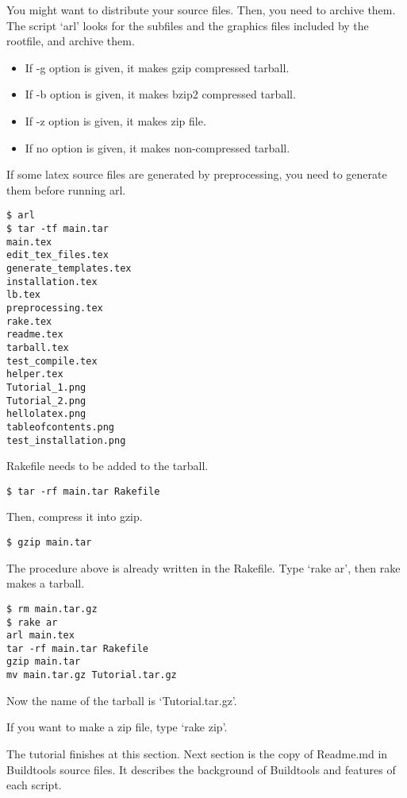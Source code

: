 You might want to distribute your source files.
Then, you need to archive them.
The script `arl' looks for the subfiles and the graphics files included by the rootfile, and archive them.
\begin{itemize}
\item If -g option is given, it makes gzip compressed tarball.
\item If -b option is given, it makes bzip2 compressed tarball.
\item If -z option is given, it makes zip file.
\item If no option is given, it makes non-compressed tarball.
\end{itemize}

If some latex source files are generated by preprocessing, you need to generate them before running arl.
\begin{verbatim}
$ arl
$ tar -tf main.tar
main.tex
edit_tex_files.tex
generate_templates.tex
installation.tex
lb.tex
preprocessing.tex
rake.tex
readme.tex
tarball.tex
test_compile.tex
helper.tex
Tutorial_1.png
Tutorial_2.png
hellolatex.png
tableofcontents.png
test_installation.png
\end{verbatim}

Rakefile needs to be added to the tarball.
\begin{verbatim}
$ tar -rf main.tar Rakefile
\end{verbatim}
Then, compress it into gzip.
\begin{verbatim}
$ gzip main.tar
\end{verbatim}

The procedure above is already written in the Rakefile.
Type `rake ar', then rake makes a tarball.
\begin{verbatim}
$ rm main.tar.gz
$ rake ar
arl main.tex
tar -rf main.tar Rakefile
gzip main.tar
mv main.tar.gz Tutorial.tar.gz
\end{verbatim}
Now the name of the tarball is `Tutorial.tar.gz'.

If you want to make a zip file, type `rake zip'.

The tutorial finishes at this section.
Next section is the copy of Readme.md in Buildtools source files.
It describes the background of Buildtools and features of each script.
